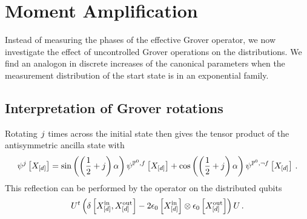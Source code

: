 \section{Moment Amplification}

Instead of measuring the phases of the effective Grover operator, we now investigate the effect of uncontrolled Grover operations on the distributions.
We find an analogon in discrete increases of the canonical parameters when the measurement distribution of the start state is in an exponential family.



\subsection{Interpretation of Grover rotations}


Rotating $j$ times across the initial state then gives the tensor product of the antisymmetric ancilla state with
\begin{align*}
    \psi^{j}\left[X_{[d]}\right]
    = \mathrm{sin}\left(\left(\frac{1}{2}+j\right)\alpha\right) \psi^{\mathbb{P}^{0},f}\left[X_{[d]}\right] +
    \mathrm{cos}\left(\left(\frac{1}{2}+j\right)\alpha\right) \psi^{\mathbb{P}^{0},\lnot f}\left[X_{[d]}\right] \, .
\end{align*}
This reflection can be performed by the operator on the distributed qubits
\begin{align*}
    U^t \left(
            \delta\left[X_{[d]}^{\mathrm{in}},X_{[d]}^{\mathrm{out}}\right]-2\epsilon_{0}\left[X_{[d]}^{\mathrm{in}}\right] \otimes \epsilon_{0}\left[X_{[d]}^{\mathrm{out}}\right]
    \right) U \, .
\end{align*}


